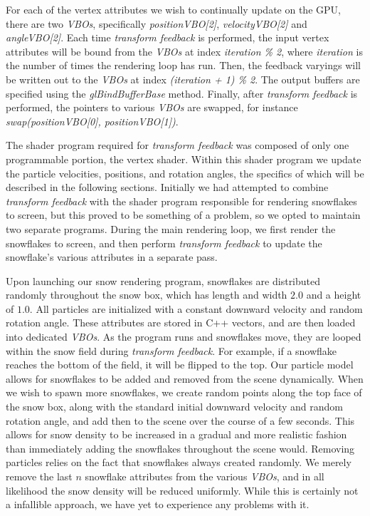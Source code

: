\documentclass[conference]{acmsiggraph}
\begin{document}
For each of the vertex attributes we wish to continually update on the GPU, there are two \textit{VBOs}, specifically \textit{positionVBO[2]}, \textit{velocityVBO[2]} and \textit{angleVBO[2]}. Each time \textit{transform feedback} is performed, the input vertex attributes will be bound from the \textit{VBOs} at index \textit{iteration \% 2}, where \textit{iteration} is the number of times the rendering loop has run. Then, the feedback varyings will be written out to the \textit{VBOs} at index \textit{(iteration + 1) \% 2}. The output buffers are specified using the \textit{glBindBufferBase} method. Finally, after \textit{transform feedback} is performed, the pointers to various \textit{VBOs} are swapped, for instance \textit{swap(positionVBO[0], positionVBO[1])}.

The shader program required for \textit{transform feedback} was composed of only one programmable portion, the vertex shader. Within this shader program we update the particle velocities, positions, and rotation angles, the specifics of which will be described in the following sections. Initially we had attempted to combine \textit{transform feedback} with the shader program responsible for rendering snowflakes to screen, but this proved to be something of a problem, so we opted to maintain two separate programs. During the main rendering loop, we first render the snowflakes to screen, and then perform \textit{transform feedback} to update the snowflake's various attributes in a separate pass.

Upon launching our snow rendering program, snowflakes are distributed randomly throughout the snow box, which has length and width $2.0$ and a height of $1.0$. All particles are initialized with a constant downward velocity and random rotation angle. These attributes are stored in C++ vectors, and are then loaded into dedicated \textit{VBOs}. As the program runs and snowflakes move, they are looped within the snow field during \textit{transform feedback}. For example, if a snowflake reaches the bottom of the field, it will be flipped to the top. Our particle model allows for snowflakes to be added and removed from the scene dynamically. When we wish to spawn more snowflakes, we create random points along the top face of the snow box, along with the standard initial downward velocity and random rotation angle, and add then to the scene over the course of a few seconds. This allows for snow density to be increased in a gradual and more realistic fashion than immediately adding the snowflakes throughout the scene would. Removing particles relies on the fact that snowflakes always created randomly. We merely remove the last $n$ snowflake attributes from the various \textit{VBOs}, and in all likelihood the snow density will be reduced uniformly. While this is certainly not a infallible approach, we have yet to experience any problems with it.
\end{document}
